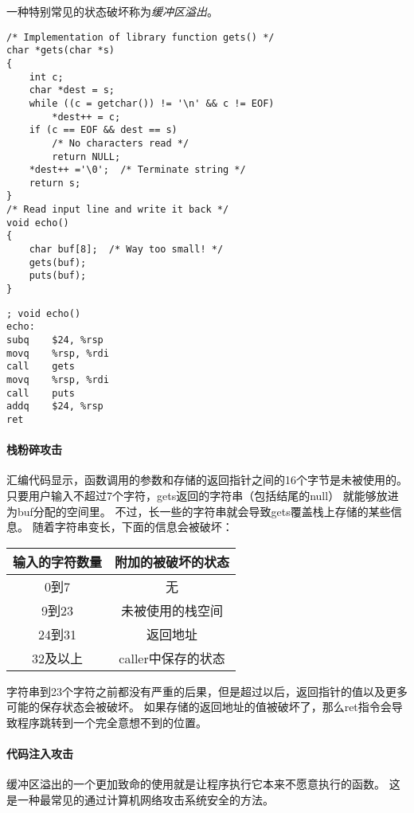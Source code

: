 一种特别常见的状态破坏称为\emph{缓冲区溢出}。
\begin{lstlisting}[style=CStyle]
/* Implementation of library function gets() */
char *gets(char *s)
{
    int c;
    char *dest = s;
    while ((c = getchar()) != '\n' && c != EOF)
        *dest++ = c;
    if (c == EOF && dest == s)
        /* No characters read */
        return NULL;
    *dest++ ='\0';  /* Terminate string */
    return s;
}
/* Read input line and write it back */
void echo()
{
    char buf[8];  /* Way too small! */
    gets(buf);
    puts(buf);
}
\end{lstlisting}
\begin{lstlisting}[style=ASMStyle]
; void echo()
echo:
subq    $24, %rsp
movq    %rsp, %rdi
call    gets
movq    %rsp, %rdi
call    puts
addq    $24, %rsp
ret
\end{lstlisting}
\paragraph{栈粉碎攻击}

汇编代码显示，函数调用的参数和存储的返回指针之间的16个字节是未被使用的。
只要用户输入不超过7个字符，gets返回的字符串（包括结尾的null） 就能够放进为buf分配的空间里。
不过，长一些的字符串就会导致gets覆盖栈上存储的某些信息。
随着字符串变长，下面的信息会被破坏：
\begin{table}[H]
    \centering
    \begin{tabular}{|c|c|}
        \hline
        输入的字符数量 & 附加的被破坏的状态    \\
        \hline
        0到7     & 无            \\
        \hline
        9到23    & 未被使用的栈空间     \\
        \hline
        24到31   & 返回地址         \\
        \hline
        32及以上   & caller中保存的状态 \\
        \hline
    \end{tabular}
\end{table}

字符串到23个字符之前都没有严重的后果，但是超过以后，返回指针的值以及更多可能的保存状态会被破坏。
如果存储的返回地址的值被破坏了，那么ret指令会导致程序跳转到一个完全意想不到的位置。

\paragraph{代码注入攻击}

缓冲区溢出的一个更加致命的使用就是让程序执行它本来不愿意执行的函数。
这是一种最常见的通过计算机网络攻击系统安全的方法。

